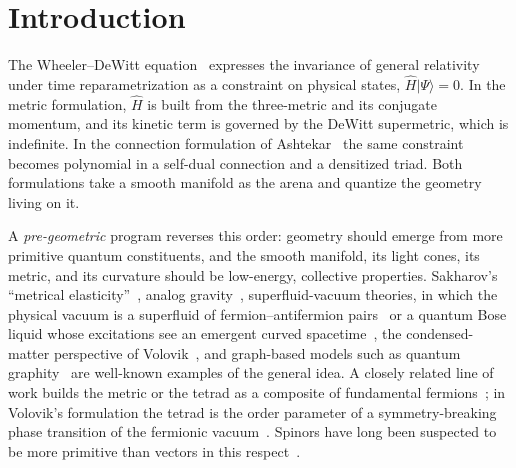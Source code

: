 \documentclass[reprint,aps,prd,amsmath,amssymb,superscriptaddress,nofootinbib,floatfix]{revtex4-2}
\theoremstyle{plain}
\theoremstyle{definition}
\theoremstyle{remark}
\newcommand{\ket}[1]{\ensuremath{|#1\rangle}}
\newcommand{\Hc}{\hat{H}}
\begin{document}
\section{Introduction}
\label{sec:intro}

The Wheeler--DeWitt equation~\cite{DeWitt1967,Wheeler1968} expresses the invariance of general
relativity under time reparametrization as a constraint on physical states, $\Hc\ket{\Psi}=0$. In the
metric formulation, $\Hc$ is built from the three-metric and its conjugate momentum, and its kinetic term
is governed by the DeWitt supermetric, which is indefinite. In the connection formulation of
Ashtekar~\cite{Ashtekar1986,Barbero1995,Rovelli2004,Thiemann2007} the same constraint becomes polynomial
in a self-dual connection and a densitized triad. Both formulations take a smooth manifold as the arena
and quantize the geometry living on it.

A \emph{pre-geometric} program reverses this order: geometry should emerge from more primitive quantum
constituents, and the smooth manifold, its light cones, its metric, and its curvature should be
low-energy, collective properties. Sakharov's ``metrical elasticity''~\cite{Sakharov2000}, analog
gravity~\cite{Unruh1981,Barcelo2011}, superfluid-vacuum theories, in which the physical vacuum is a superfluid of
fermion--antifermion pairs~\cite{SinhaSivaramSudarshan1976,SinhaSudarshan1978} or a quantum Bose liquid whose
excitations see an emergent curved spacetime~\cite{Zloshchastiev2020,Zloshchastiev2023}, the condensed-matter perspective
of Volovik~\cite{Volovik2009}, and graph-based models such as quantum graphity~\cite{KMS2008} are well-known examples of
the general idea. A closely related line of work builds the metric or the tetrad as a composite of fundamental
fermions~\cite{Akama1978,AkamaCMT1978,Wetterich2004,Diakonov2011,VladimirovDiakonov2012}; in Volovik's formulation the
tetrad is the order parameter of a symmetry-breaking phase transition of the fermionic vacuum~\cite{Volovik2022,Volovik2024}.
Spinors have long been suspected to be more primitive than vectors in this
respect~\cite{PenroseRindler1984,Penrose1967}.
\end{document}
